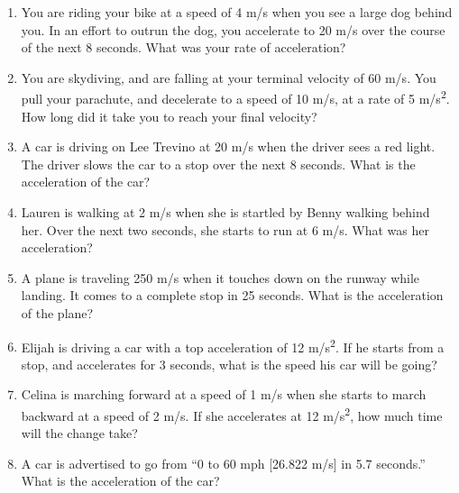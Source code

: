 \documentclass[letterpaper, 12pt]{article}
\begin{document}
\begin{enumerate}
\item You are riding your bike at a speed of 4 m/s when you see a large dog behind you.  In an effort to outrun the dog, you accelerate to 20 m/s over the course of the next 8 seconds.  What was your rate of acceleration?
\vspace{1in}
\item You are skydiving, and are falling at your terminal velocity of 60 m/s.  You pull your parachute, and decelerate to a speed of 10 m/s, at a rate of 5 m/s\textsuperscript{2}.  How long did it take you to reach your final velocity?
\vspace{1in}
\item A car is driving on Lee Trevino at 20 m/s when the driver sees a red light.  The driver slows the car to a stop over the next 8 seconds.  What is the acceleration of the car?
\vspace{1.5in}
\item Lauren is walking at 2 m/s when she is startled by Benny walking behind her. Over the next two seconds, she starts to run at 6 m/s. What was her acceleration?
\vspace{1in}
\item A plane is traveling 250 m/s when it touches down on the runway while landing.  It comes to a complete stop in 25 seconds.  What is the acceleration of the plane?
\vspace{1in}
\item Elijah is driving a car with a top acceleration of 12 m/s\textsuperscript{2}.  If he starts from a stop, and accelerates for 3 seconds, what is the speed his car will be going?
\vspace{1in}
\item Celina is marching forward at a speed of 1 m/s when she starts to march backward at a speed of 2 m/s.  If she accelerates at 12 m/s\textsuperscript{2}, how much time will the change take?
\vspace{1in}
\item A car is advertised to go from “0 to 60 mph [26.822 m/s] in 5.7 seconds.”  What is the acceleration of the car?







	
\end{enumerate}
 
\end{document}
